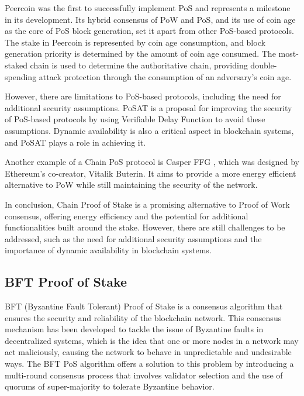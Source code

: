 Peercoin \cite{peercoin_foundation} was the first to successfully implement PoS and represents a milestone in its development. Its hybrid consensus of PoW and PoS, and its use of coin age as the core of PoS block generation, set it apart from other PoS-based protocols. The stake in Peercoin is represented by coin age consumption, and block generation priority is determined by the amount of coin age consumed. The most-staked chain is used to determine the authoritative chain, providing double-spending attack protection through the consumption of an adversary's coin age.

However, there are limitations to PoS-based protocols, including the need for additional security assumptions. PoSAT is a proposal for improving the security of PoS-based protocols by using Verifiable Delay Function to avoid these assumptions. Dynamic availability is also a critical aspect in blockchain systems, and PoSAT plays a role in achieving it.

Another example of a Chain PoS protocol is Casper FFG \cite{buterin2017casper}, which was designed by Ether\-eum's co-creator, Vitalik Buterin. It aims to provide a more energy efficient alternative to PoW while still maintaining the security of the network.

In conclusion, Chain Proof of Stake is a promising alternative to Proof of Work consensus, offering energy efficiency and the potential for additional functionalities built around the stake. However, there are still challenges to be addressed, such as the need for additional security assumptions and the importance of dynamic availability in blockchain systems.


\subsection*{\textbf{BFT Proof of Stake}}

BFT (Byzantine Fault Tolerant) Proof of Stake is a consensus algorithm that ensures the security and reliability of the blockchain network. This consensus mechanism has been developed to tackle the issue of Byzantine faults in decentralized systems, which is the idea that one or more nodes in a network may act maliciously, causing the network to behave in unpredictable and undesirable ways. The BFT PoS algorithm offers a solution to this problem by introducing a multi-round consensus process that involves validator selection and the use of quorums of super-majority to tolerate Byzantine behavior.

